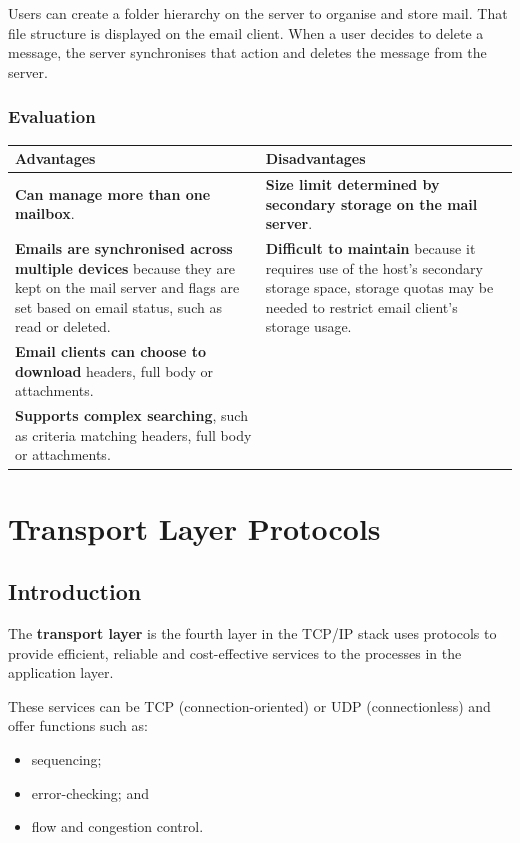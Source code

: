 \documentclass[a4paper]{systems-software}
\begin{document}
Users can create a folder hierarchy on the server to organise and store mail. That file structure is displayed on the email client. When a user decides to delete a message, the server synchronises that action and deletes the message from the server.


\newpage

\subsection*{Evaluation}

\begin{longtabu} to \textwidth {| X[1,l] | X[1,l] |}
	\hline
	\textbf{Advantages} & \textbf{Disadvantages}
	\\ \hline
	\textbf{Can manage more than one mailbox}. &
	\textbf{Size limit determined by secondary storage on the mail server}.
	\\ \hline
	\textbf{Emails are synchronised across multiple devices} because they are kept on the mail server and flags are set based on email status, such as read or deleted. & \textbf{Difficult to maintain} because it requires use of the host’s secondary storage space, storage quotas may be needed to restrict email client’s storage usage.
	\\ \hline
	\textbf{Email clients can choose to download} headers, full body or attachments. &
	\\ \hline
	\textbf{Supports complex searching}, such as criteria matching headers, full body or attachments. &
	\\ \hline
\end{longtabu}


\chapter{Transport Layer Protocols}
\label{chap:17}

\section{Introduction}

The \textbf{transport layer} is the fourth layer in the TCP/IP stack uses protocols to provide efficient, reliable and cost-effective services to the processes in the application layer.

These services can be TCP (connection-oriented) or UDP (connectionless) and offer functions such as:
\begin{itemize}
	\item sequencing;
	\item error-checking; and
	\item flow and congestion control.
\end{itemize}
\end{document}
